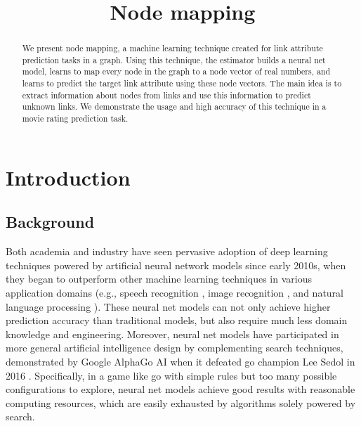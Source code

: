 \documentclass{article}
\begin{document}
\lstset{language=python, tabsize=4}
\title{Node mapping}
\maketitle

\begin{abstract}
	We present node mapping, a machine learning technique created for link 
	attribute prediction tasks in a graph.
	Using this technique, the estimator builds a neural net model, learns to 
	map every node in the graph to a node vector of real numbers, and learns to 
	predict the target link attribute using these node vectors.
	The main idea is to extract information about nodes from links and use this 
	information to predict unknown links.
	We demonstrate the usage and high accuracy of this technique in a movie 
	rating prediction task.
\end{abstract}

\section{Introduction}

\subsection{Background}
Both academia and industry have seen pervasive adoption of deep learning 
techniques powered by artificial neural network models since early 2010s, when 
they began to outperform other machine learning techniques in various 
application domains (e.g., speech recognition \cite{hannun2014deep}, image 
recognition \cite{simonyan2014very}, and natural language processing 
\cite{yao2013recurrent}).
These neural net models can not only achieve higher prediction accuracy than 
traditional models, but also require much less domain knowledge and engineering.
Moreover, neural net models have participated in more general artificial 
intelligence design by complementing search techniques, demonstrated by
Google AlphaGo AI when it defeated go champion Lee Sedol in 2016 
\cite{silver2016mastering}.
Specifically, in a game like go with simple rules but too many possible 
configurations to explore, neural net models achieve good results with 
reasonable computing resources, which are easily exhausted by algorithms solely 
powered by search.
\end{document}
